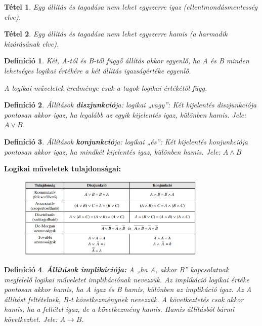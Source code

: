 \documentclass[12pt,a4paper]{article}
\newtheorem{theorem}{Tétel} [section]
\newtheorem{definition}{Definíció} [section]
\begin{document}
\begin{theorem}
Egy állítás és tagadása nem lehet egyszerre igaz (ellentmondásmentesség elve).
\end{theorem}

\begin{theorem}
Egy állítás és tagadása nem lehet egyszerre hamis (a harmadik kizárásának elve).
\end{theorem}

\begin{definition}
Két, A-tól és B-től függő állítás akkor egyenlő, ha A és B minden lehetséges logikai értékére a két állítás igazságértéke egyenlő.

A logikai műveletek eredménye csak a tagok logikai értékétől függ.
\end{definition}

\begin{definition}
Állítások \textbf{diszjunkció}ja: logikai „vagy”: Két kijelentés diszjunkciója pontosan akkor igaz, ha legalább az egyik kijelentés igaz, különben hamis.
Jele: $A \lor B$.
\end{definition}

\begin{definition}
Állítások \textbf{konjunkció}ja: logikai „és”: Két kijelentés konjunkciója pontosan akkor igaz, ha mindkét kijelentés igaz, különben hamis.
Jele: $A \land B$
\end{definition}
\newpage
\textbf{Logikai műveletek tulajdonságai:}
\begin{figure}[h]
\centering
\includegraphics[width=0.8\textwidth]{logikai_muv_tul}
\end{figure}

\begin{definition}
\textbf{Állítások implikációja:} A „ha A, akkor B” kapcsolatnak megfelelő logikai műveletet implikációnak nevezzük. Az implikáció logikai értéke pontosan akkor hamis, ha A igaz és B hamis, különben az implikáció igaz. Az A állítást feltételnek, B-t következménynek nevezzük. A következtetés csak akkor hamis, ha a feltétel igaz, de a következmény hamis. Hamis állításból bármi következhet.
Jele: $A \rightarrow B$.
\end{definition}
\end{document}
